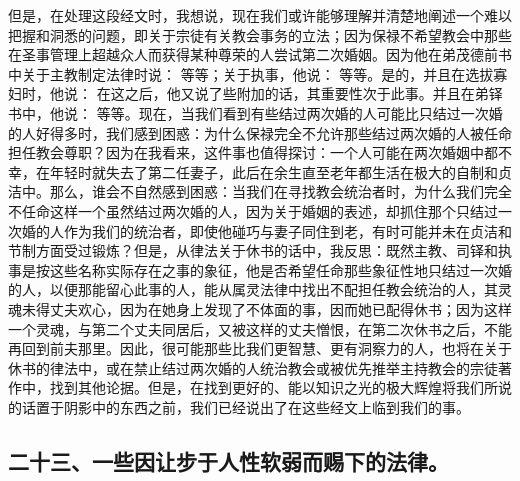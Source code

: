 但是，在处理这段经文时，我想说，现在我们或许能够理解并清楚地阐述一个难以把握和洞悉的问题，即关于宗徒有关教会事务的立法；因为保禄不希望教会中那些在圣事管理上超越众人而获得某种尊荣的人尝试第二次婚姻。因为他在弟茂德前书中关于主教制定法律时说： 等等；关于执事，他说： 等等。是的，并且在选拔寡妇时，他说： 在这之后，他又说了些附加的话，其重要性次于此事。并且在弟铎书中，他说： 等等。现在，当我们看到有些结过两次婚的人可能比只结过一次婚的人好得多时，我们感到困惑：为什么保禄完全不允许那些结过两次婚的人被任命担任教会尊职？因为在我看来，这件事也值得探讨：一个人可能在两次婚姻中都不幸，在年轻时就失去了第二任妻子，此后在余生直至老年都生活在极大的自制和贞洁中。那么，谁会不自然感到困惑：当我们在寻找教会统治者时，为什么我们完全不任命这样一个虽然结过两次婚的人，因为关于婚姻的表述，却抓住那个只结过一次婚的人作为我们的统治者，即使他碰巧与妻子同住到老，有时可能并未在贞洁和节制方面受过锻炼？但是，从律法关于休书的话中，我反思：既然主教、司铎和执事是按这些名称实际存在之事的象征，他是否希望任命那些象征性地只结过一次婚的人，以便那能留心此事的人，能从属灵法律中找出不配担任教会统治的人，其灵魂未得丈夫欢心，因为在她身上发现了不体面的事，因而她已配得休书；因为这样一个灵魂，与第二个丈夫同居后，又被这样的丈夫憎恨，在第二次休书之后，不能再回到前夫那里。因此，很可能那些比我们更智慧、更有洞察力的人，也将在关于休书的律法中，或在禁止结过两次婚的人统治教会或被优先推举主持教会的宗徒著作中，找到其他论据。但是，在找到更好的、能以知识之光的极大辉煌将我们所说的话置于阴影中的东西之前，我们已经说出了在这些经文上临到我们的事。\par


\subsection{二十三、一些因让步于人性软弱而赐下的法律。}

